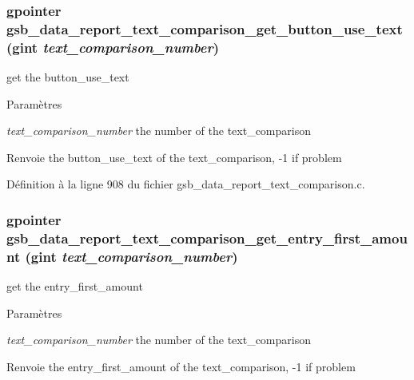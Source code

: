 \subsubsection[{gsb\_\-data\_\-report\_\-text\_\-comparison\_\-get\_\-button\_\-use\_\-text}]{\setlength{\rightskip}{0pt plus 5cm}gpointer gsb\_\-data\_\-report\_\-text\_\-comparison\_\-get\_\-button\_\-use\_\-text (gint {\em text\_\-comparison\_\-number})}\label{gsb__data__report__text__comparison_8c_a6e6be29beafd0d972e146091e38e0955}
get the button\_\-use\_\-text


\begin{DoxyParams}{Paramètres}
\item[{\em text\_\-comparison\_\-number}]the number of the text\_\-comparison\end{DoxyParams}
\begin{DoxyReturn}{Renvoie}
the button\_\-use\_\-text of the text\_\-comparison, -\/1 if problem 
\end{DoxyReturn}


Définition à la ligne 908 du fichier gsb\_\-data\_\-report\_\-text\_\-comparison.c.

\subsubsection[{gsb\_\-data\_\-report\_\-text\_\-comparison\_\-get\_\-entry\_\-first\_\-amount}]{\setlength{\rightskip}{0pt plus 5cm}gpointer gsb\_\-data\_\-report\_\-text\_\-comparison\_\-get\_\-entry\_\-first\_\-amount (gint {\em text\_\-comparison\_\-number})}\label{gsb__data__report__text__comparison_8c_a40e301a26e8349feb8b4b6f7b72ee87f}
get the entry\_\-first\_\-amount


\begin{DoxyParams}{Paramètres}
\item[{\em text\_\-comparison\_\-number}]the number of the text\_\-comparison\end{DoxyParams}
\begin{DoxyReturn}{Renvoie}
the entry\_\-first\_\-amount of the text\_\-comparison, -\/1 if problem 
\end{DoxyReturn}



